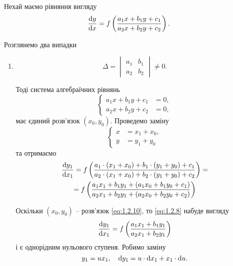 Нехай маємо рівняння вигляду
\begin{equation}
	\label{eq:1.2.8}
	\frac{\mathop{}\!\mathrm{d} y}{\mathop{}\!\mathrm{d} x} = f \left( \frac{a_1 x + b_1 y + c_1}{a_2 x + b_2 y + c_2} \right).
\end{equation}

Розглянемо два випадки
\begin{enumerate}
	\item 
	\begin{equation}
		\label{eq:1.2.9}
		\Delta = \begin{vmatrix} a_1 & b_1 \\ a_2 & b_2 \end{vmatrix} \ne 0.
	\end{equation}

	Тоді система алгебраїчних рівнянь
	\begin{equation}
		\label{eq:1.2.10}
		\left\{
			\begin{aligned}
				a_1 x + b_1 y + c_1 &= 0, \\
				a_2 x + b_2 y + c_2 &= 0,
			\end{aligned}
		\right.
	\end{equation}
	має єдиний розв’язок $(x_0, y_0)$. Проведемо заміну 
	\begin{equation}
		\label{eq:1.2.10_5}
		\left\{\begin{aligned}
			x &= x_1 + x_0, \\
			y &= y_1 + y_0
		\end{aligned}\right.
	\end{equation}
	та отримаємо
	\begin{multline}
		\label{eq:1.2.11}
		\frac{\mathop{}\!\mathrm{d} y_1}{\mathop{}\!\mathrm{d} x_1} = f \left( \frac{a_1 \cdot (x_1 + x_0) + b_1 \cdot (y_1 + y_0) + c_1}{a_2 \cdot (x_1 + x_0) + b_2 \cdot (y_1 + y_0) + c_2} \right) = \\
		= f \left( \frac{a_1 x_1 + b_1 y_1 + (a_1 x_0 + b_1 y_0 + c_1)}{a_2 x_1 + b_2 y_1 + (a_2 x_0 + b_2 y_0 + c_2)} \right)
	\end{multline}

	Оскільки $(x_0, y_0)$ -- розв’язок \eqref{eq:1.2.10}, то \eqref{eq:1.2.8} набуде вигляду
	\begin{equation}
		\label{eq:1.2.12}
		\frac{\mathop{}\!\mathrm{d} y_1}{\mathop{}\!\mathrm{d} x_1} = f \left( \frac{a_1 x_1 + b_1 y_1}{a_2 x_1 + b_2 y_1} \right)
	\end{equation}
	і є однорідним нульового ступеня. Робимо заміну 
	\begin{equation}
		\label{eq:1.2.12_5}
		y_1 = u x_1, \quad \mathop{}\!\mathrm{d} y_1 = u \cdot \mathop{}\!\mathrm{d} x_1 + x_1 \cdot \mathop{}\!\mathrm{d} u.
	\end{equation}


\end{enumerate}
